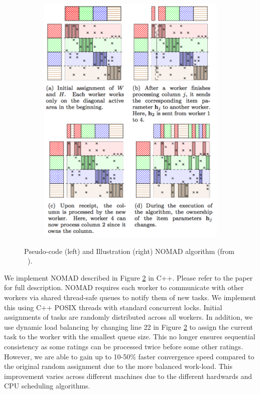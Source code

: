 \documentclass{article} %
\begin{document}
\begin{figure}[h]
  \begin{subfigure}[b]{0.5\textwidth}
    \includegraphics[width=\textwidth]{figures/nomad}
    \label{fig:nomad}
  \end{subfigure}
  \vspace{-20pt}
  \caption{Pseudo-code (left) and Illustration (right) NOMAD algorithm (from ~\cite{yun2013nomad}).}\label{fig:nomad}
\end{figure}

We implement NOMAD \cite{yun2013nomad} described in Figure \ref{fig:nomad} in
C++. Please refer to the paper for full description. NOMAD requires each
worker to communicate with other workers via shared thread-safe queues to
notify them of new tasks. We implement this using C++ POSIX threads with
standard concurrent locks. Initial assignments of tasks are randomly
distributed across all workers. In addition, we use dynamic load balancing by
changing line 22 in Figure \ref{fig:nomad} to assign the current task to the
worker with the smallest queue size. This no longer ensures sequential
consistency as some ratings can be processed twice before some other ratings.
However, we are able to gain up to 10-50\% faster convergence speed compared
to the original random assignment due to the more balanced work-load. This
improvement varies across different machines due to the different hardwards
and CPU scheduling algorithms.
\end{document}
